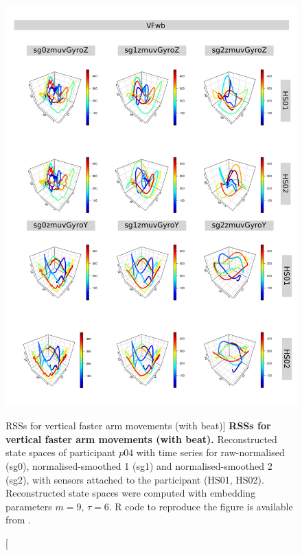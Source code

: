 \begin{figure}
\centering
\includegraphics[height=0.8\textheight]{rss_VFwb_p04}
\caption
	[RSSs for vertical faster arm movements (with beat)]{
	{\bf RSSs for vertical faster arm movements (with beat).}
	Reconstructed state spaces of participant $p04$
	with time series for raw-normalised (sg0), 
	normalised-smoothed 1 (sg1) and 
	normalised-smoothed 2 (sg2), 
	with sensors attached to the participant (HS01, HS02).
	Reconstructed state spaces were computed with 
	embedding parameters $m=9$, $\tau=6$.
	R code to reproduce the figure is available from \cite{xochicale2018}.
        }
     \label{fig:rss_VFwb_p04}
\end{figure}






